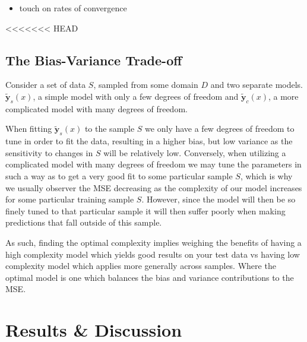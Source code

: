 \documentclass[reprint, english, nofootinbib]{revtex4-2}
\begin{document}
            \begin{itemize}
                \item touch on rates of convergence
            \end{itemize}

<<<<<<< HEAD
    \subsection{The Bias-Variance Trade-off}
        \noindent
        Consider a set of data $S$, sampled from some domain $D$ and two separate models. $\tilde{\mathbf y}_s(x)$, a simple model with only a few degrees of freedom and $\tilde{\mathbf y}_c(x)$, a more complicated model with many degrees of freedom.

        When fitting $\mathbf{\tilde y}_s(x)$ to the sample $S$ we only have a few degrees of freedom to tune in order to fit the data, resulting in a higher bias, but low variance as the sensitivity to changes in $S$ will be relatively low. Conversely, when utilizing a complicated model with many degrees of freedom we may tune the parameters in such a way as to get a very good fit to some particular sample $S$, which is why we usually observer the MSE decreasing as the complexity of our model increases for some particular training sample $S$. However, since the model will then be so finely tuned to that particular sample it will then suffer poorly when making predictions that fall outside of this sample.

        As such, finding the optimal complexity implies weighing the benefits of having a high complexity model which yields good results on your test data vs having low complexity model which applies more generally across samples. Where the optimal model is one which balances the bias and variance contributions to the MSE.


\section{Results \& Discussion}
\end{document}
